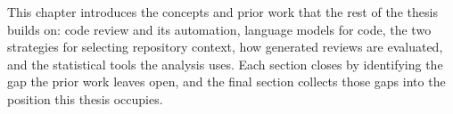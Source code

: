 This chapter introduces the concepts and prior work that the rest of the thesis
builds on: code review and its automation, language models for code, the two
strategies for selecting repository context, how generated reviews are
evaluated, and the statistical tools the analysis uses. Each section closes by
identifying the gap the prior work leaves open, and the final section collects
those gaps into the position this thesis occupies.








